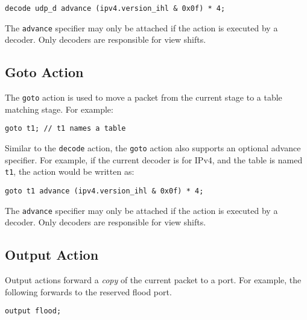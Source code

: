 \begin{codepage}
\begin{lstlisting}
decode udp_d advance (ipv4.version_ihl & 0x0f) * 4;
\end{lstlisting}
\end{codepage}

The \texttt{advance} specifier may only be attached if the action is executed by a
decoder. Only decoders are responsible for view shifts.

\subsection{Goto Action} \label{tut:goto_action}

The \texttt{goto} action is used to move a packet from the current stage to a
table matching stage. For example:

\begin{codepage}
\begin{lstlisting}
goto t1; // t1 names a table
\end{lstlisting}
\end{codepage}

Similar to the \texttt{decode} action, the \texttt{goto} action also supports an
optional advance specifier. For example, if the current decoder is for IPv4, and
the table is named \texttt{t1}, the action would be written as:

\begin{codepage}
\begin{lstlisting}
goto t1 advance (ipv4.version_ihl & 0x0f) * 4;
\end{lstlisting}
\end{codepage}

The \texttt{advance} specifier may only be attached if the action is executed by a
decoder. Only decoders are responsible for view shifts.

\subsection{Output Action} \label{tut:output_action}

Output actions forward a \textit{copy} of the current packet to a port. 
For example, the following forwards to the reserved flood port. 

\begin{codepage}
\begin{lstlisting}
output flood;
\end{lstlisting}
\end{codepage}

